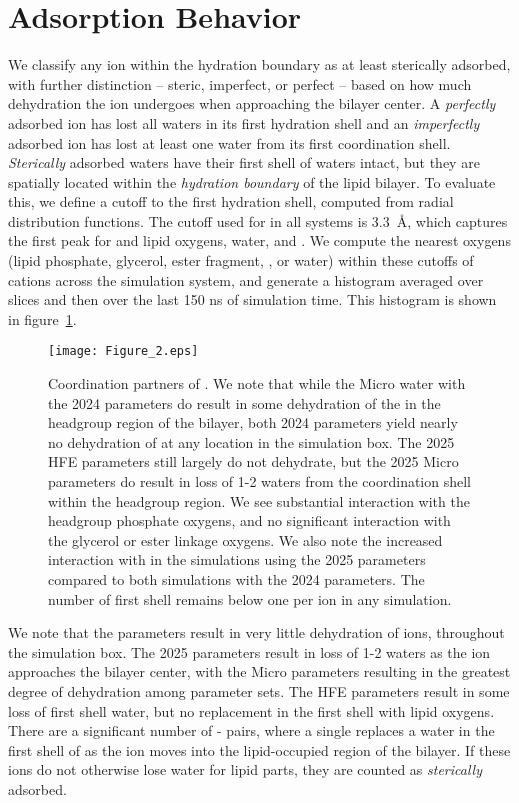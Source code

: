 \section{\mg Adsorption Behavior}
We classify any ion within the hydration boundary as at least sterically adsorbed, with further distinction -- steric, imperfect, or perfect -- based on how much dehydration the ion undergoes when approaching the bilayer center. A \emph{perfectly} adsorbed ion has lost all waters in its first hydration shell and an  \emph{imperfectly} adsorbed ion
has lost at least one water from its first coordination shell. 
{\emph{Sterically} adsorbed} waters have their first shell of waters intact, but 
they are spatially located within the \emph{hydration boundary} of the lipid bilayer. To evaluate this, we define a cutoff to the first hydration shell,
computed from radial distribution functions. The cutoff used for \mg{} in all systems is 3.3~\AA, which captures the first peak for \mg{} and lipid oxygens, water, and \cl{}. 
We compute the nearest oxygens (lipid phosphate, glycerol, ester fragment, \cl{}, or water) within these
cutoffs of cations across the simulation system, and generate a histogram averaged over slices and then over the last 150 ns of simulation time. This histogram is shown in 
figure~\ref{figch4:ioncoordination}.
\begin{figure}[H]
    \caption[First-shell coordination partners of \mg]{Coordination partners of \mg{}. We note that while the Micro water with the 2024 parameters do result in some dehydration 
        of the \mg{} in the headgroup region of the bilayer, both 2024 parameters yield nearly no dehydration of \mg{} at any location in the simulation box. The 2025 HFE parameters
        still largely do not dehydrate, but the 2025 Micro parameters do result in loss of 1-2 waters from the \mg{} coordination shell within the headgroup region. 
        We see substantial interaction with the headgroup phosphate oxygens, and no significant interaction with the glycerol or ester linkage oxygens. We also note the increased interaction with \cl{} in the 
    simulations using the 2025 parameters compared to both simulations with the 2024 parameters. The number of first shell \cl{} remains below one per ion in any simulation.}
\label{figch4:ioncoordination}
\texttt{[image: Figure\_2.eps]}
\end{figure}
We note that the  parameters result in very little dehydration of ions, throughout the simulation box. The 2025 parameters result in loss of 1-2 waters as the ion approaches the bilayer center, with the  Micro parameters resulting in the greatest degree of dehydration among parameter sets.
The  HFE parameters result in some loss of first shell water, but no replacement in the first shell with lipid oxygens. There are a significant number of \mg{}-\cl{} pairs, where a single \cl{} replaces a water
in the first shell of \mg{} as the ion moves into the lipid-occupied region of the bilayer. If these ions do not otherwise lose water for lipid parts, 
they are counted as \emph{sterically} adsorbed.

